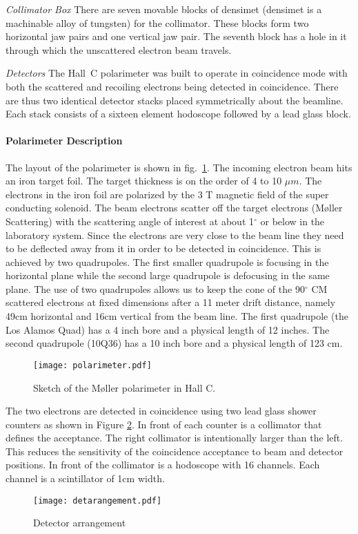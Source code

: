 {\sl Collimator Box} There are seven movable blocks of densimet (densimet is
a machinable alloy of tungsten) for the collimator. These blocks form two
horizontal jaw pairs and one vertical jaw pair. The seventh block has a
hole in it through which the unscattered electron beam travels.

{\sl Detectors} The Hall~C polarimeter was built to operate in coincidence
mode with both the scattered and recoiling electrons being detected in
coincidence. There are thus two identical detector stacks placed symmetrically
about the beamline. Each stack consists of a sixteen element hodoscope
followed by a lead glass block.

\paragraph{Polarimeter Description}
The layout of the polarimeter is shown in fig.~\ref{polscetch}.
The incoming electron beam hits an iron target foil. The target thickness
is on the order of 4 to 10 $\mu m$. The electrons in the iron foil
are polarized by the 3 T magnetic field of the super conducting solenoid.
The beam electrons scatter off 
the target electrons (M\o ller Scattering) 
with the scattering angle of interest at about
1$^{\circ}$ or below in the laboratory system. Since the electrons
are very close to the beam line they need to be deflected away from
it in order to be detected in coincidence. This is achieved by
two quadrupoles. The first smaller quadrupole is focusing in the
horizontal plane  while the
second large quadrupole is defocusing in the same plane. The use of two quadrupoles
allows us to keep the cone of the 90$^{\circ}$ CM scattered electrons 
at fixed dimensions after a 11 meter drift distance, namely
49cm horizontal and 16cm vertical from the beam line.
The first quadrupole (the Los Alamos Quad) has a 4 inch bore and a
physical length of 12 inches. The second quadrupole (10Q36) has a 10
inch bore and a physical length of 123 cm.
\begin{figure}[htp]
\begin{center}
\texttt{[image: polarimeter.pdf]}
\caption{Sketch of the M\o ller polarimeter in Hall C.\label{polscetch}}
\end{center}
\end{figure}
The two electrons are detected in coincidence using two lead glass 
shower counters as shown in Figure \ref{detarr}. In front of each counter is a collimator that defines
the acceptance. The right collimator is intentionally larger
than the left. This reduces the sensitivity of the coincidence 
acceptance to beam and detector positions. In front of the collimator
is a hodoscope with 16 channels. Each channel is a scintillator of 1cm
width.
\begin{figure}
\texttt{[image: detarangement.pdf]}
\begin{center}
\parbox{10cm}{
\caption{Detector arrangement}\label{detarr}}
\end{center}
\end{figure}


